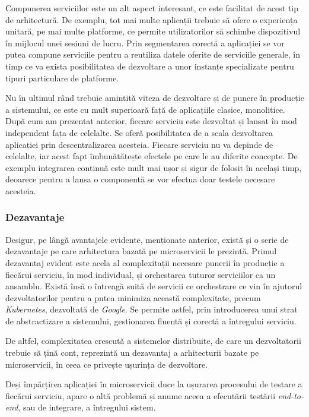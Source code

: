 Compunerea serviciilor este un alt aspect interesant, ce este facilitat de acest tip de arhitectură. De exemplu, tot mai multe aplicații trebuie să ofere o experiența unitară, pe mai multe platforme, ce permite utilizatorilor să schimbe dispozitivul în mijlocul unei sesiuni de lucru. Prin segmentarea corectă a aplicației se vor putea compune serviciile pentru a reutiliza datele oferite de serviciile generale, în timp ce va exista posibilitatea de dezvoltare a unor instanțe specializate pentru tipuri particulare de platforme. 

Nu în ultimul rând trebuie amintită viteza de dezvoltare și de punere în producție a sistemului, ce este cu mult superioară față de aplicațiile clasice, monolitice. După cum am prezentat anterior, fiecare serviciu este dezvoltat și lansat în mod independent fața de celelalte. Se oferă posibilitatea de a scala dezvoltarea aplicației prin descentralizarea acesteia. Fiecare serviciu nu va depinde de celelalte, iar acest fapt îmbunătățește efectele pe care le au diferite concepte. De exemplu integrarea continuă este mult mai ușor și sigur de folosit în același timp, deoarece pentru a lansa o componentă se vor efectua doar testele necesare acesteia. 

\subsubsection{Dezavantaje}

Desigur, pe lângă avantajele evidente, menționate anterior, există și o serie de dezavantaje pe care arhitectura bazată pe microservicii le prezintă\cite{onmicro}. Primul dezavantaj evident este acela al complexitații necesare punerii în producție a fiecărui serviciu, în mod individual, și orchestarea tuturor serviciilor ca un ansamblu. Există însă o întreagă suită de servicii ce orchestrare ce vin în ajutorul dezvoltatorilor pentru a putea minimiza această complexitate, precum \textit{Kubernetes}, dezvoltată de \textit{Google}. Se permite astfel, prin introducerea unui strat de abstractizare a sistemului, gestionarea fluentă și corectă a întregului serviciu. \cite{kubernetes}

De altfel, complexitatea crescută a sistemelor distribuite, de care un dezvoltatorii trebuie să țină cont, reprezintă un dezavantaj a arhitecturii bazate pe microservicii, în ceea ce privește ușurința de dezvoltare. 

Deși împărțirea aplicației în microservicii duce la ușurarea procesului de testare a fiecărui serviciu, apare o altă problemă și anume aceea a efecutării testării \textit{end-to-end}, sau de integrare, a întregului sistem. 

